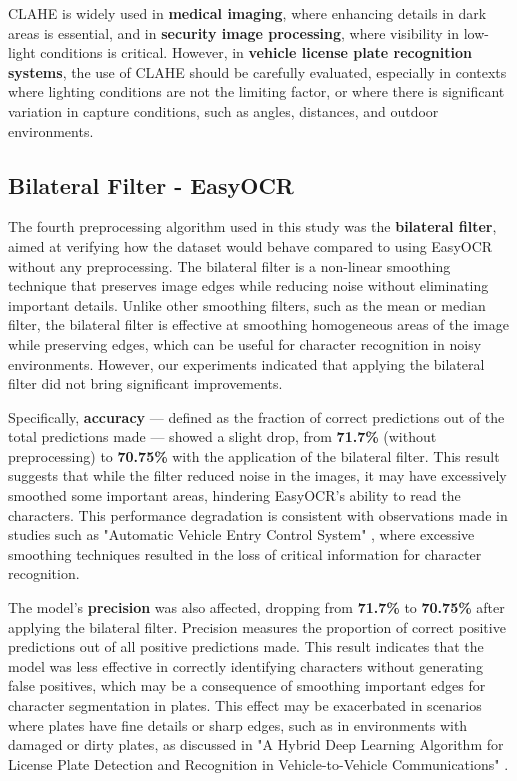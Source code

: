 \documentclass[conference]{IEEEtran}
\begin{document}
    CLAHE is widely used in \textbf{medical imaging}, where enhancing details in dark areas is essential, and in \textbf{security image processing}, where visibility in low-light conditions is critical. However, in \textbf{vehicle license plate recognition systems}, the use of CLAHE should be carefully evaluated, especially in contexts where lighting conditions are not the limiting factor, or where there is significant variation in capture conditions, such as angles, distances, and outdoor environments.
    
    \subsection{Bilateral Filter - EasyOCR}
    
    The fourth preprocessing algorithm used in this study was the \textbf{bilateral filter}, aimed at verifying how the dataset would behave compared to using EasyOCR without any preprocessing. The bilateral filter is a non-linear smoothing technique that preserves image edges while reducing noise without eliminating important details. Unlike other smoothing filters, such as the mean or median filter, the bilateral filter is effective at smoothing homogeneous areas of the image while preserving edges, which can be useful for character recognition in noisy environments. However, our experiments indicated that applying the bilateral filter did not bring significant improvements.
    
    Specifically, \textbf{accuracy} — defined as the fraction of correct predictions out of the total predictions made — showed a slight drop, from \textbf{71.7\%} (without preprocessing) to \textbf{70.75\%} with the application of the bilateral filter. This result suggests that while the filter reduced noise in the images, it may have excessively smoothed some important areas, hindering EasyOCR's ability to read the characters. This performance degradation is consistent with observations made in studies such as "Automatic Vehicle Entry Control System" \cite{b9}, where excessive smoothing techniques resulted in the loss of critical information for character recognition.
    
    The model's \textbf{precision} was also affected, dropping from \textbf{71.7\%} to \textbf{70.75\%} after applying the bilateral filter. Precision measures the proportion of correct positive predictions out of all positive predictions made. This result indicates that the model was less effective in correctly identifying characters without generating false positives, which may be a consequence of smoothing important edges for character segmentation in plates. This effect may be exacerbated in scenarios where plates have fine details or sharp edges, such as in environments with damaged or dirty plates, as discussed in "A Hybrid Deep Learning Algorithm for License Plate Detection and Recognition in Vehicle-to-Vehicle Communications" \cite{b7}.
    
\end{document}
